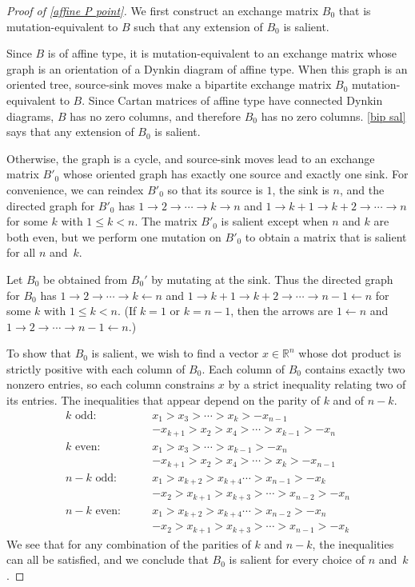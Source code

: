 \documentclass{amsart}
\theoremstyle{definition}
\theoremstyle{remark}
\numberwithin{equation}{section}
\newcommand{\reals}{\mathbb R}
\newcommand{\0}{{\mathbf{0}}}
\begin{document}
\begin{proof}[Proof of \cref{affine P point}]
We first construct an exchange matrix $B_0$ that is mutation-equivalent to $B$ such that any extension of $B_0$ is salient.

Since $B$ is of affine type, it is mutation-equivalent to an exchange matrix whose graph is an orientation of a Dynkin diagram of affine type.
When this graph is an oriented tree, source-sink moves make a bipartite exchange matrix $B_0$ mutation-equivalent to $B$.
Since Cartan matrices of affine type have connected Dynkin diagrams, $B$ has no zero columns, and therefore $B_0$ has no zero columns.
\cref{bip sal} says that any extension of $B_0$ is salient.

Otherwise, the graph is a cycle, and source-sink moves lead to an exchange matrix $B'_0$ whose oriented graph has exactly one source and exactly one sink.
For convenience, we can reindex $B'_0$ so that its source is $1$, the sink is $n$, and the directed graph for $B'_0$ has ${1\to2\to\cdots\to k\to n}$ and $1\to k+1\to k+2\to\cdots\to n$ for some $k$ with $1\le k<n$.
The matrix $B'_0$ is salient except when $n$ and $k$ are both even, but we perform one mutation on $B'_0$ to obtain a matrix that is salient for all $n$ and~$k$.

Let $B_0$ be obtained from $B_0'$ by mutating at the sink.
Thus the directed graph for $B_0$ has ${1\to2\to\cdots\to k\leftarrow n}$ and $1\to k+1\to k+2\to\cdots\to n-1\leftarrow n$ for some $k$ with $1\le k<n$.
(If $k=1$ or $k=n-1$, then the  arrows are $1\leftarrow n$ and $1\to2\to\cdots\to n-1\leftarrow n$.)

To show that $B_0$ is salient, we wish to find a vector $x\in\reals^n$ whose dot product is strictly positive with each column of $B_0$.
Each column of $B_0$ contains exactly two nonzero entries, so each column constrains $x$ by a strict inequality relating two of its entries.
The inequalities that appear depend on the parity of $k$ and of $n-k$.
\begin{align*}
k\text{ odd:}\qquad
&x_1>x_3>\cdots>x_k>-x_{n-1}\\
&-x_{k+1}>x_2>x_4>\cdots>x_{k-1}>-x_n\\
k\text{ even:}\qquad
&x_1>x_3>\cdots>x_{k-1}>-x_n\\
&-x_{k+1}>x_2>x_4>\cdots>x_k>-x_{n-1}\\
n-k\text{ odd:}\qquad
&x_1>x_{k+2}>x_{k+4}\cdots>x_{n-1}>-x_k\\
&-x_2>x_{k+1}>x_{k+3}>\cdots>x_{n-2}>-x_n\\
n-k\text{ even:}\qquad
&x_1>x_{k+2}>x_{k+4}\cdots>x_{n-2}>-x_n\\
&-x_2>x_{k+1}>x_{k+3}>\cdots>x_{n-1}>-x_k
\end{align*}
We see that for any combination of the parities of $k$ and $n-k$, the inequalities can all be satisfied, and we conclude that $B_0$ is salient for every choice of $n$ and~$k$.


\end{proof}
\end{document}
